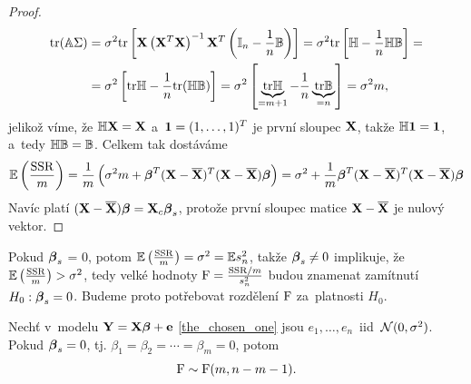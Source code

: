 \begin{proof}
\begin{align*}
\mathrm{tr} (\mathbb{A} \Sigma) & = \sigma^2 \mathrm{tr} \left[\mathbf{X} \left(\mathbf{X}^T \mathbf{X} \right)^{-1} \mathbf{X}^T \left(\mathbb{I}_{n} - \frac{1}{n} \mathbb{B} \right) \right] = \sigma^2 \mathrm{tr}\left[\mathbb{H} - \frac{1}{n} \mathbb{H} \mathbb{B} \right] = \\
& = \sigma^2 \left[\mathrm{tr} \mathbb{H} - \frac{1}{n} \mathrm{tr} (\mathbb{H} \mathbb{B}) \right] = \sigma^2 \left[\underbrace{\mathrm{tr} \mathbb{H}}_{ = m+1} - \frac{1}{n} \underbrace{\mathrm{tr} \mathbb{B}}_{ = n} \right] = \sigma^2 m,
\end{align*}
jelikož víme, že $\mathbb{H} \mathbf{X} = \mathbf{X}$ a~$\mathbf{1} = (1,\dots, 1)^T$ je první sloupec $\mathbf{X}$, takže $\mathbb{H} \mathbf{1} = \mathbf{1}$, a~tedy $\mathbb{H} \mathbb{B} = \mathbb{B}$. Celkem tak dostáváme
 $$
\mathbb{E} \left(\frac{\mathrm{SSR}}{m} \right) = \frac{1}{m} \left(\sigma^2 m + \boldsymbol{\beta}^T (\mathbf{X} - \overline{\mathbf{X}})^T(\mathbf{X} - \overline{\mathbf{X}}) \boldsymbol{\beta} \right) = \sigma^2 + \frac{1}{m} \boldsymbol{\beta}^T (\mathbf{X} - \overline{\mathbf{X}})^T(\mathbf{X} - \overline{\mathbf{X}}) \boldsymbol{\beta}
 $$
Navíc platí $(\mathbf{X} - \overline{\mathbf{X}}) \boldsymbol{\beta} = \mathbf{X}_c \boldsymbol{\beta}_s$, protože první sloupec matice $\mathbf{X} - \overline{\mathbf{X}}$ je nulový vektor.
\end{proof}

\begin{remark}
Pokud $\boldsymbol{\beta}_s$ = 0, potom $\mathbb{E} \left(\frac{\mathrm{SSR}}{m} \right) = \sigma^2 = \mathbb{E} s_n^2$, takže $\boldsymbol{\beta}_s \neq 0$ implikuje, že $\mathbb{E} \left(\frac{\mathrm{SSR}}{m} \right) > \sigma^2$, tedy velké hodnoty $\mathrm{F} = \frac{\mathrm{SSR}/m}{s_n^2}$ budou znamenat zamítnutí $H_0: \boldsymbol{\beta}_s = 0$. Budeme proto potřebovat rozdělení $\mathrm{F}$ za~platnosti $H_0$.
\end{remark}

\begin{theorem}
Nechť v~modelu $\mathbf{Y} = \mathbf{X} \boldsymbol{\beta} + \mathbf{e}$ \eqref{the_chosen_one} jsou $e_1,\dots, e_n $~iid~$\mathcal{N}(0,\sigma^2)$. Pokud $\boldsymbol{\beta}_s = 0$, tj. $\beta_1 = \beta_2 = \cdots = \beta_m = 0$, potom
 $$
\mathrm{F} \sim \mathrm{F}(m, n - m -1).
 $$
\end{theorem}


